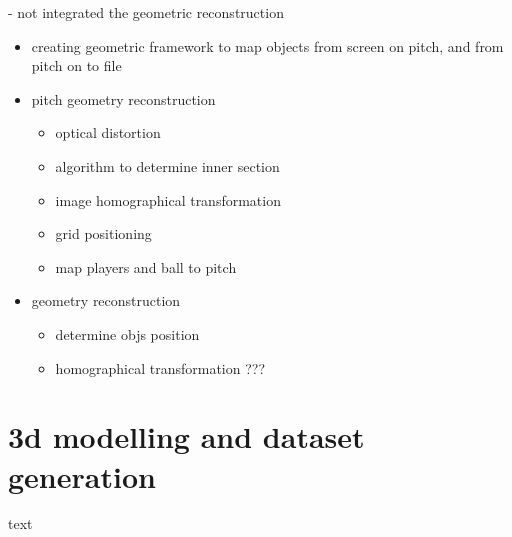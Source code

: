 \documentclass[
11pt,
twoside
]{report}
\begin{document}
- not integrated the geometric reconstruction


\begin{itemize}
\item
creating geometric framework to map objects from screen on pitch, and from pitch on to file
\end{itemize}

\begin{itemize}
\item
  pitch geometry reconstruction

  \begin{itemize}
  \item
    optical distortion
  \item
    algorithm to determine inner section
  \item
    image homographical transformation
  \item
    grid positioning
  \item
    map players and ball to pitch
  \end{itemize}
\end{itemize}


\begin{itemize}
\item
    geometry reconstruction
    \begin{itemize}
      \item
        determine objs position
      \item
        homographical transformation ???
    \end{itemize}
\end{itemize}





\section{3d modelling and dataset generation}


text
\end{document}
